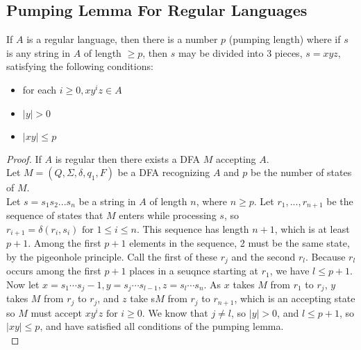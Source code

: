 \documentclass[11pt,a4paper]{article}
\begin{document}
\subsection{Pumping Lemma For Regular Languages}
\begin{theorem}
    If $A$ is a regular language, then there is a number $p$ (pumping length) where if $s$ is any string in $A$ of length $\geq p$, then $s$ may be divided into 3 pieces, $s=xyz$, satisfying the following conditions:
    \begin{itemize}
        \item for each $i\geq 0,xy^iz\in A$
        \item $|y|>0$
        \item $|xy|\leq p$
    \end{itemize}

    \begin{proof}
        If $A$ is regular then there exists a DFA $M$ accepting $A$. \\

        Let $M=(Q,\Sigma,\delta,q_1,F)$ be a DFA recognizing $A$ and $p$ be the number of states of $M$. \\

        Let $s=s_1s_2...s_n$ be a string in $A$ of length $n$, where $n\geq p$. Let $r_1,...,r_{n+1}$ be the sequence of states that $M$ enters while processing $s$, so $r_{i+1}=\delta(r_i,s_i)\text{ for }1\leq i\leq n$.
        This sequence has length $n+1$, which is at least $p+1$.
        Among the first $p+1$ elements in the sequence, 2 must be the same state, by the pigeonhole principle.
        Call the first of these $r_j$ and the second $r_l$. Because $r_l$ occurs among the first $p+1$ places in a seuqnce starting at $r_1$, we have $l\leq p+1$. \\

        Now let $x=s_1\cdots s_j-1,y=s_j\cdots s_{l-1},z=s_l\cdots s_n$. As $x$ takes $M$ from $r_1$ to $r_j$, $y$ takes $M$ from $r_j$ to $r_j$, and $z$ take s$M$ from $r_j$ to $r_{n+1}$, which is an accepting state so $M$ must accept $xy^iz\text{ for }i\geq 0$.
        We know that $j\neq l$, so $|y|>0$, and $l\leq p+1$, so $|xy|\leq p$, and have satisfied all conditions of the pumping lemma. \\
    \end{proof}
\end{theorem}
\end{document}
